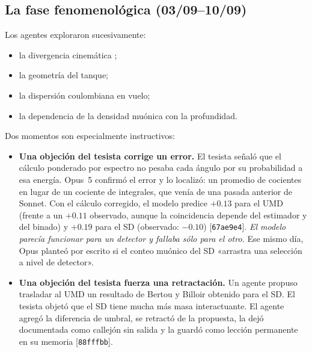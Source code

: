 \documentclass[11pt,a4paper]{article}
\newcommand{\ev}[1]{{\small\color{nota}[#1]}}   %
\newcommand{\code}[1]{\texttt{#1}}
\begin{document}
\subsection{La fase fenomenológica (03/09--10/09)}
Los agentes exploraron sucesivamente:
\begin{itemize}
  \item la divergencia cinemática \cite{cazon};
  \item la geometría del tanque;
  \item la dispersión coulombiana en vuelo;
  \item la dependencia de la densidad muónica con la profundidad.
\end{itemize}
Dos momentos son especialmente instructivos:
\begin{itemize}
  \item \textbf{Una objeción del tesista corrige un error.} El tesista señaló que el cálculo ponderado por
  espectro no pesaba cada ángulo por su probabilidad a esa energía. Opus~5 confirmó el error y lo localizó:
  un promedio de cocientes en lugar de un cociente de integrales, que venía de una pasada anterior de
  Sonnet. Con el cálculo corregido, el modelo predice $+0.13$ para el UMD (frente a un $+0.11$ observado,
  aunque la coincidencia depende del estimador y del binado) y $+0.19$ para el SD (observado: $-0.10$)
  \ev{\code{67ae9e4}}. \emph{El modelo parecía funcionar para un detector y fallaba sólo para el otro.}
  Ese mismo día, Opus planteó por escrito si el conteo muónico del SD «arrastra una selección a nivel de
  detector».
  \item \textbf{Una objeción del tesista fuerza una retractación.} Un agente propuso trasladar al UMD un
  resultado de Bertou y Billoir \cite{bb} obtenido para el SD. El tesista objetó que el SD tiene mucha más
  masa interactuante. El agente agregó la diferencia de umbral, se retractó de la propuesta, la dejó
  documentada como callejón sin salida y la guardó como lección permanente en su memoria
  \ev{\code{88fffbb}}.
\end{itemize}
\end{document}
